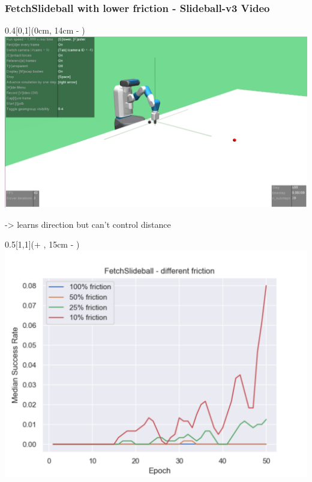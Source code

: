 



\begin{frame}
	\frametitle{FetchSlideball with lower friction - 		\textbf{Slideball-v3 Video}}	
	\vspace{1cm}
	
	\begin{textblock*}{0.4\paperwidth}[0,1](0cm, 14cm - \PraesentationSeitenrand)%
		\includegraphics[width=0.4\paperwidth]{./Ressourcen/Figures/FetchSlideball-v2.pdf}
		
		-> learns direction but can't control distance 
	\end{textblock*}
	
	\begin{textblock*}{0.5\paperwidth}[1,1](\textwidth + \PraesentationSeitenrand, 15cm - \PraesentationSeitenrand)%
		\includegraphics[width=0.5\paperwidth]{./Ressourcen/Figures/fig_FetchSlideball_friction.pdf}
	\end{textblock*}
	
	
	
	
	
\end{frame}
\clearpage

